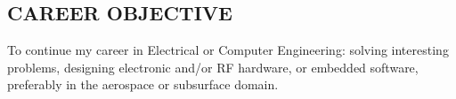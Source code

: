 \documentclass[line,mmmargin]{res}
\begin{document}
\address{51 Irene St.}
\address{Chicopee MA 01013}
 
\begin{resume}
 \setlength\multicolsep{0pt}

\section{CAREER OBJECTIVE}   
	To continue my career in Electrical or Computer Engineering: 
	solving interesting problems, designing electronic and/or RF hardware, 
    or embedded software, preferably in the aerospace or subsurface domain.
 

\end{resume}
\end{document}
